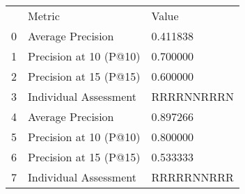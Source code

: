\begin{tabular}{lll}
 & Metric & Value \\
0 & Average Precision & 0.411838 \\
1 & Precision at 10 (P@10) & 0.700000 \\
2 & Precision at 15 (P@15) & 0.600000 \\
3 & Individual Assessment & RRRRNNRRRN \\
4 & Average Precision & 0.897266 \\
5 & Precision at 10 (P@10) & 0.800000 \\
6 & Precision at 15 (P@15) & 0.533333 \\
7 & Individual Assessment & RRRRRNNRRR \\
\end{tabular}

